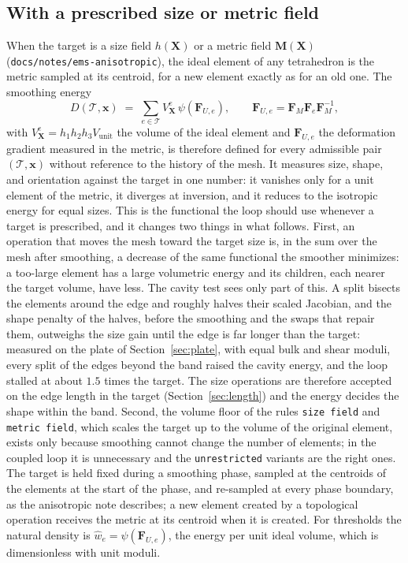 \documentclass[11pt]{article}
\newcommand{\code}[1]{\texttt{#1}}
\newcommand{\bs}[1]{\boldsymbol{#1}}
\begin{document}
\subsection{With a prescribed size or metric field}
\label{sec:prescribed}

When the target is a size field $h(\bs X)$ or a metric field
$\bs M(\bs X)$ (\code{docs/notes/ems-anisotropic}), the ideal element
of any tetrahedron is the metric sampled at its centroid, for a new
element exactly as for an old one. The smoothing energy
\begin{equation}
D(\mathcal{T}, \bs{x}) \;=\; \sum_{e \in \mathcal{T}}
V^e_{\bs X}\, \psi\!\left(\bs F_{U,e}\right),
\qquad
\bs F_{U,e} = \bs F_M \bs F_e \bs F_M^{-1},
\label{eq:metric-functional}
\end{equation}
with $V^e_{\bs X} = h_1 h_2 h_3 V_{\mathrm{unit}}$ the volume of the
ideal element and $\bs F_{U,e}$ the deformation gradient measured in
the metric, is therefore defined for every admissible pair
$(\mathcal{T}, \bs x)$ without reference to the history of the mesh.
It measures size, shape, and orientation against the target in one
number: it vanishes only for a unit element of the metric, it diverges at
inversion, and it reduces to the isotropic energy for equal sizes. This
is the functional the loop should use whenever a target is prescribed,
and it changes two things in what follows. First, an operation that
moves the mesh toward the target size is, in the sum over the mesh
after smoothing, a decrease of the same functional the smoother
minimizes: a too-large element has a large volumetric energy and its
children, each nearer the target volume, have less. The cavity test
sees only part of this. A split bisects the elements around the edge
and roughly halves their scaled Jacobian, and the shape penalty of the
halves, before the smoothing and the swaps that repair them, outweighs
the size gain until the edge is far longer than the target: measured on
the plate of Section~\ref{sec:plate}, with equal bulk and shear moduli,
every split of the edges beyond the band raised the cavity energy, and
the loop stalled at about $1.5$ times the target. The size operations
are therefore accepted on the edge length in the target
(Section~\ref{sec:length}) and the energy decides the shape within the
band. Second, the volume floor of the rules \code{size field} and
\code{metric field}, which scales the target up to the volume of the
original element, exists only because smoothing cannot change the number
of elements; in the coupled loop it is unnecessary and the
\code{unrestricted} variants are the right ones. The target is held
fixed during a smoothing phase, sampled at the centroids of the elements
at the start of the phase, and re-sampled at every phase boundary, as
the anisotropic note describes; a new element created by a topological
operation receives the metric at its centroid when it is created. For
thresholds the natural density is $\hat w_e = \psi(\bs F_{U,e})$, the
energy per unit ideal volume, which is dimensionless with unit moduli.
\end{document}
